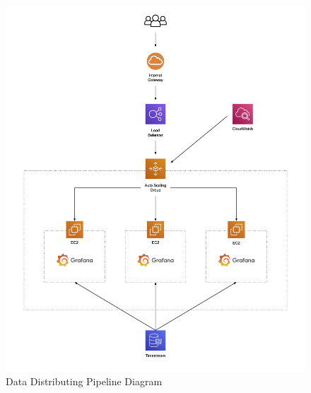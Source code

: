 \documentclass[12pt,oneside]{book} %
\begin{document}
\begin{figure}[H]
    \centering
    \includegraphics[width=1\linewidth]{images/cloud-computing-clients.png}
    \caption{Data Distributing Pipeline Diagram}
\end{figure}
\end{document}
